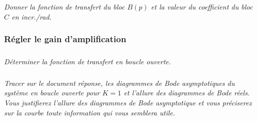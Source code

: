 \documentclass[10pt,fleqn]{article} %
\begin{document}
\subparagraph{}\textit{Donner la fonction de transfert du bloc $B(p)$ et la valeur du coefficient du bloc $C$ en incr./rad.} 

\subsubsection*{Régler le gain d'amplification}

\subparagraph{}\textit{Déterminer la fonction de transfert en boucle ouverte.}%


\subparagraph{}\textit{Tracer sur le document réponse, les diagrammes de Bode asymptotiques du système en boucle ouverte pour $K=1$ et l'allure des diagrammes de Bode réels. Vous justifierez l’allure des diagrammes de Bode asymptotique et vous préciserez sur la courbe toute information qui vous semblera utile.}

%

%
%
\end{document}
